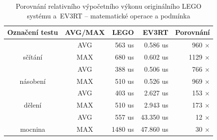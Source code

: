 \begin{table}[h]
\centering

\caption{Porovnání relativního výpočetního výkonu originálního LEGO systému a~EV3RT -- matematické operace a podmínka \\
}

\label{Benchmark-math}
\begin{tabular}{@{}ccrrr@{}}
\toprule
Označení testu                                       & AVG/MAX                     & LEGO                               & EV3RT                                & Porovnání                                                    \\ \midrule
\multicolumn{1}{|c}{}                                & \cellcolor[HTML]{EFEFEF}AVG & \cellcolor[HTML]{EFEFEF}    563 us & \cellcolor[HTML]{EFEFEF}    0.586 us & \multicolumn{1}{r|}{\cellcolor[HTML]{EFEFEF}    960 $\times$}  \\
\multicolumn{1}{|c}{\multirow{-2}{*}{sčítání}}           & \cellcolor[HTML]{FFFFFF}MAX & \cellcolor[HTML]{FFFFFF}    680 us & \cellcolor[HTML]{FFFFFF}    0.602 us & \multicolumn{1}{r|}{\cellcolor[HTML]{FFFFFF}   1129 $\times$}  \\ \midrule
\multicolumn{1}{|c}{}                                & \cellcolor[HTML]{EFEFEF}AVG & \cellcolor[HTML]{EFEFEF}    388 us & \cellcolor[HTML]{EFEFEF}    0.506 us & \multicolumn{1}{r|}{\cellcolor[HTML]{EFEFEF}    766 $\times$}  \\
\multicolumn{1}{|c}{\multirow{-2}{*}{násobení}}          & \cellcolor[HTML]{FFFFFF}MAX & \cellcolor[HTML]{FFFFFF}    510 us & \cellcolor[HTML]{FFFFFF}    0.526 us & \multicolumn{1}{r|}{\cellcolor[HTML]{FFFFFF}    969 $\times$}  \\ \midrule
\multicolumn{1}{|c}{}                                & \cellcolor[HTML]{EFEFEF}AVG & \cellcolor[HTML]{EFEFEF}    403 us & \cellcolor[HTML]{EFEFEF}    2.627 us & \multicolumn{1}{r|}{\cellcolor[HTML]{EFEFEF}    153 $\times$}  \\
\multicolumn{1}{|c}{\multirow{-2}{*}{dělení}}           & \cellcolor[HTML]{FFFFFF}MAX & \cellcolor[HTML]{FFFFFF}    510 us & \cellcolor[HTML]{FFFFFF}    2.943 us & \multicolumn{1}{r|}{\cellcolor[HTML]{FFFFFF}    173 $\times$}  \\ \midrule
\multicolumn{1}{|c}{}                                & \cellcolor[HTML]{EFEFEF}AVG & \cellcolor[HTML]{EFEFEF}    557 us & \cellcolor[HTML]{EFEFEF}   43.350 us & \multicolumn{1}{r|}{\cellcolor[HTML]{EFEFEF}     12 $\times$}  \\
\multicolumn{1}{|c}{\multirow{-2}{*}{mocnina}}           & \cellcolor[HTML]{FFFFFF}MAX & \cellcolor[HTML]{FFFFFF}   1480 us & \cellcolor[HTML]{FFFFFF}   47.860 us & \multicolumn{1}{r|}{\cellcolor[HTML]{FFFFFF}     30 $\times$}  \\ \midrule

\end{tabular}
\end{table}
